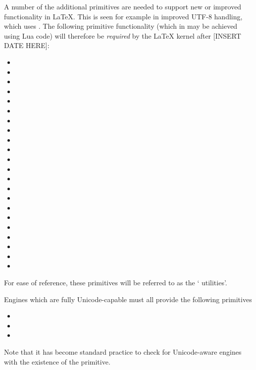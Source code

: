 \documentclass{ltnews}
\providecommand\LuaTeX{\hologo{LuaTeX}}
\providecommand\pdfTeX{\hologo{pdfTeX}}
\begin{document}
A number of the additional primitives are needed to support new or improved
functionality in \LaTeX{}. This is seen for example in improved UTF-8 handling,
which uses . The following primitive functionality (which in
\LuaTeX{} may be achieved using Lua code) will therefore be \emph{required} by
the \LaTeX{} kernel after [INSERT DATE HERE]:
\begingroup\setlength\columnsep{0pt}
\begin{multicols}{2}
\begin{itemize}
  \item {}
  \item {}
  \item {}
  \item {}
  \item {}
  \item {}
  \item {}
  \item {}
  \item {}
  \item {}
  \item {}
  \item {}
  \item {}
  \item {}
  \item {}
  \item {}
  \item {}
  \item {}
  \item {}
  \item {}
  \item {}
  \item {}
\end{itemize}
\end{multicols}
\endgroup
For ease of reference, these primitives will be referred to as the
`\pdfTeX{} utilities'.

Engines which are fully Unicode-capable must all provide the following
primitives
\begingroup\setlength\columnsep{0pt}
\begin{multicols}{2}
\begin{itemize}
  \item {}
  \item {}
  \item {}
\end{itemize}
\end{multicols}
\endgroup
Note that it has become standard practice to check for Unicode-aware engines
with the existence of the  primitive.
\end{document}
